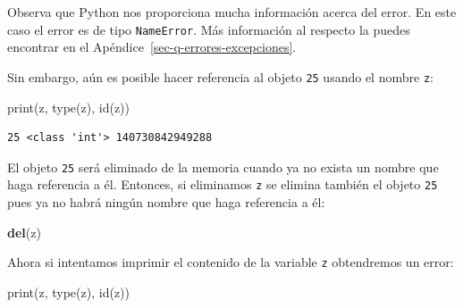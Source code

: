\documentclass[
  spanish,
  letterpaper,
]{scrbook}
\newenvironment{Shaded}{\begin{snugshade}}{\end{snugshade}}
\newcommand{\BuiltInTok}[1]{\textcolor[rgb]{0.00,0.23,0.31}{#1}}
\newcommand{\KeywordTok}[1]{\textcolor[rgb]{0.00,0.23,0.31}{\textbf{#1}}}
\newcommand{\NormalTok}[1]{\textcolor[rgb]{0.00,0.23,0.31}{#1}}
\theoremstyle{definition}
\theoremstyle{remark}
\begin{document}
\begin{tcolorbox}[enhanced jigsaw, colframe=quarto-callout-note-color-frame, opacityback=0, toprule=.15mm, colback=white, coltitle=black, leftrule=.75mm, arc=.35mm, breakable, left=2mm, bottomtitle=1mm, rightrule=.15mm, bottomrule=.15mm, colbacktitle=quarto-callout-note-color!10!white, toptitle=1mm, titlerule=0mm, opacitybacktitle=0.6, title=\textcolor{quarto-callout-note-color}{\faInfo}\hspace{0.5em}{Nota.}]

Observa que Python nos proporciona mucha información acerca del error.
En este caso el error es de tipo \texttt{NameError}. Más información al
respecto la puedes encontrar en el
Apéndice~\ref{sec-q-errores-excepciones}.

\end{tcolorbox}

Sin embargo, aún es posible hacer referencia al objeto \texttt{25}
usando el nombre \texttt{z}:

\begin{Shaded}
\begin{Highlighting}[]
\BuiltInTok{print}\NormalTok{(z, }\BuiltInTok{type}\NormalTok{(z), }\BuiltInTok{id}\NormalTok{(z))}
\end{Highlighting}
\end{Shaded}

\begin{verbatim}
25 <class 'int'> 140730842949288
\end{verbatim}

El objeto \texttt{25} será eliminado de la memoria cuando ya no exista
un nombre que haga referencia a él. Entonces, si eliminamos \texttt{z}
se elimina también el objeto \texttt{25} pues ya no habrá ningún nombre
que haga referencia a él:

\begin{Shaded}
\begin{Highlighting}[]
\KeywordTok{del}\NormalTok{(z)}
\end{Highlighting}
\end{Shaded}

Ahora si intentamos imprimir el contenido de la variable \texttt{z}
obtendremos un error:

\begin{Shaded}
\begin{Highlighting}[]
\BuiltInTok{print}\NormalTok{(z, }\BuiltInTok{type}\NormalTok{(z), }\BuiltInTok{id}\NormalTok{(z))}
\end{Highlighting}
\end{Shaded}
\end{document}
